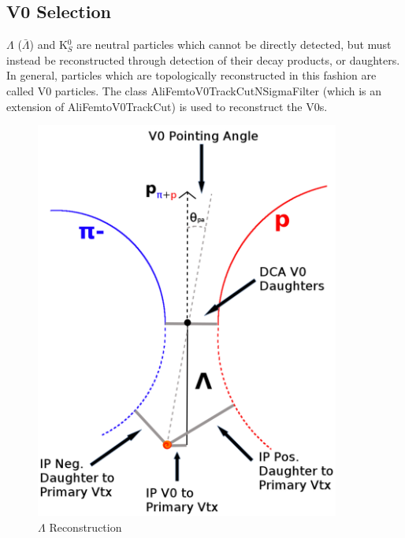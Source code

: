 \documentclass[../AnalysisNoteJBuxton.tex]{subfiles}
\begin{document}
\subsection{V0 Selection}
\label{V0Selection}

$\Lambda$ ($\bar{\Lambda}$) and K$^{0}_{S}$ are neutral particles which cannot be directly detected, but must instead be reconstructed through detection of their decay products, or daughters.  
In general, particles which are topologically reconstructed in this fashion are called V0 particles.
The class AliFemtoV0TrackCutNSigmaFilter (which is an extension of AliFemtoV0TrackCut) is used to reconstruct the V0s.

\begin{figure}[h]
  \centering
  \includegraphics[width=100mm]{3_DataSelection/Figures/V0Cuts.pdf}
  \caption[$\Lambda$ Reconstruction]{$\Lambda$ Reconstruction}
  \label{fig:LamReconstruction}
\end{figure}
\end{document}
